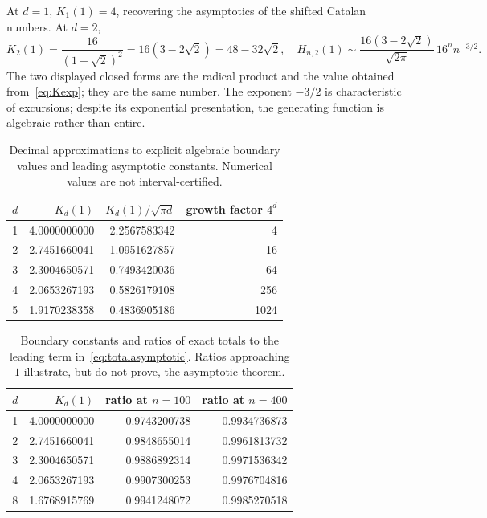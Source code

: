 \documentclass[11pt]{article}
\numberwithin{equation}{section}
\theoremstyle{definition}
\begin{document}
At $d=1$, $K_1(1)=4$, recovering the asymptotics of the shifted Catalan
numbers. At $d=2$,
\begin{equation}
 K_2(1)=\frac{16}{(1+\sqrt2)^2}=16(3-2\sqrt2)=48-32\sqrt2,
 \quad
 H_{n,2}(1)\sim\frac{16(3-2\sqrt2)}{\sqrt{2\pi}}\,
                    16^n n^{-3/2}.
 \label{eq:doubleconstant}
\end{equation}
The two displayed closed forms are the radical product and the value obtained
from~\eqref{eq:Kexp}; they are the same number.
The exponent $-3/2$ is characteristic of excursions; despite its exponential
presentation, the generating function is algebraic rather than entire.

\begin{table}[htbp]
\centering
\begin{tabular}{r r r r}
\toprule
$d$ & $K_d(1)$ & $K_d(1)/\sqrt{\pi d}$ & growth factor $4^d$\\
\midrule
1&4.0000000000&2.2567583342&4\\
2&2.7451660041&1.0951627857&16\\
3&2.3004650571&0.7493420036&64\\
4&2.0653267193&0.5826179108&256\\
5&1.9170238358&0.4836905186&1024\\
\bottomrule
\end{tabular}
\caption{Decimal approximations to explicit algebraic boundary values and
leading asymptotic constants. Numerical values are not interval-certified.}
\label{tab:constants}
\end{table}

\begin{table}[htbp]
\centering
\begin{tabular}{r r r r}
\toprule
$d$ & $K_d(1)$ & ratio at $n=100$ & ratio at $n=400$\\
\midrule
1 & 4.0000000000 & 0.9743200738 & 0.9934736873\\
2 & 2.7451660041 & 0.9848655014 & 0.9961813732\\
3 & 2.3004650571 & 0.9886892314 & 0.9971536342\\
4 & 2.0653267193 & 0.9907300253 & 0.9976704816\\
8 & 1.6768915769 & 0.9941248072 & 0.9985270518\\
\bottomrule
\end{tabular}
\caption{Boundary constants and ratios of exact totals to the leading term
in~\eqref{eq:totalasymptotic}. Ratios approaching $1$ illustrate, but do not
prove, the asymptotic theorem.}
\label{tab:ratios}
\end{table}
\end{document}
